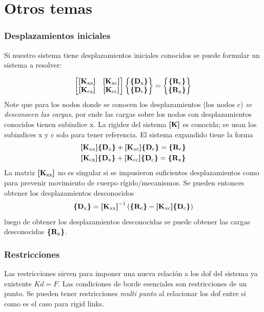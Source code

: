 
\part{Otros temas}

\section{Desplazamientos iniciales} \label{sec:desplzImpuestos}
Si nuestro sistema tiene desplazamientos iniciales conocidos se puede formular un sistema a resolver:

\begin{equation}
	\begin{bmatrix}
	\MKxx & \MKxc \\
	\MKcx & \MKcc
	\end{bmatrix}
	\begin{Bmatrix}
	\CDx \\
	\CDc 
	\end{Bmatrix}
	=	\begin{Bmatrix}
	\CRc \\
	\CRx 
	\end{Bmatrix}
\end{equation} 
Note que para los nodos donde se conocen los desplazamientos (los nodos $\mathrm{c}$) \textit{se desconocen las cargas}, por ende las cargas sobre los nodos con desplazamientos conocidos tienen subíndice $\mathrm{x}$. La rigidez del sistema $\MK{}$ es conocida; se usan los subindices $\mathrm{x}$ y $\mathrm{c}$ solo para tener referencia. El sistema expandido tiene la forma
\begin{gather*} 
	\MKxx \CDx + \MKxc \CDc = \CRc \\
	\MKcx \CDx + \MKcc \CDc = \CRx 
\end{gather*}
La matriz $\MKxx$ no es singular si se impusieron suficientes desplazamientos como para prevenir movimiento de cuerpo rígido/mecanismos. Se pueden entonces obtener los desplazamientos desconocidos
\[
\CDx = \MKxx^{-1} \left( \CRc - \MKxc  \CDc \right)
\]
luego de obtener los desplazamientos desconocidas se puede obtener las cargas desconocidas $\CRx$.


\section{Restricciones}
Las restricciones sirven para imponer una nueva relación a los dof del sistema ya existente $Kd=F$. Las condiciones de borde esenciales son restricciones de un punto. Se pueden tener restricciones \textit{multi punto} al relacionar los dof entre si como es el caso para rigid links.


